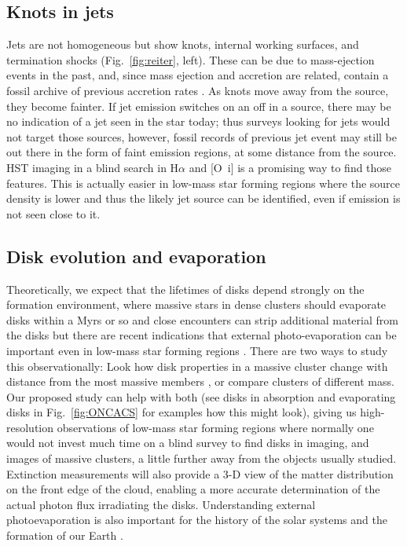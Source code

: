 \documentclass[12pt]{article}
\begin{document}
\subsection{Knots in jets}
Jets are not homogeneous but show knots, internal working surfaces, and termination shocks (Fig.~\ref{fig:reiter}, left). These can be due to mass-ejection events in the past, and, since mass ejection and accretion are related, contain a fossil archive of previous accretion rates \citep{2014A&A...563A..87E}. As knots move away from the source, they become fainter. If jet emission switches on an off in a source, there may be no indication of a jet seen in the star today; thus surveys looking for jets would not target those sources, however, fossil records of previous jet event may still be out there in the form of faint emission regions, at some distance from the source. HST imaging in a blind search in H$\alpha$ and [O~{\sc i}] is a promising way to find those features. This is actually easier in low-mass star forming regions where the source density is lower and thus the likely jet source can be identified, even if emission is not seen close to it.

\subsection{Disk evolution and evaporation}


Theoretically, we expect that the lifetimes of disks depend strongly on the formation environment, where massive stars in dense clusters should evaporate disks within a Myrs or so and close encounters can strip additional material from the disks \citep[e.g.][]{2004ApJ...611..360A,2019MNRAS.485.1489W,2019arXiv190211094N} but there are recent indications that external photo-evaporation can be important even in low-mass star forming regions \citep{2017MNRAS.468L.108H}.
There are two ways to study this observationally: Look how disk properties in a massive cluster change with distance from the most massive members \citep{2014ApJ...784...82M,2017AJ....153..240A,2018ApJ...860...77E}, or compare clusters of different mass. Our proposed study can help with both (see disks in absorption and evaporating disks in Fig.~\ref{fig:ONCACS} for examples how this might look), giving us high-resolution observations of low-mass star forming regions where normally one would not invest much time on a blind survey to find disks in imaging, and images of massive clusters, a little further away from the objects usually studied. Extinction measurements will also provide a 3-D view of the matter distribution on the front edge of the cloud, enabling a more accurate determination of the actual photon flux irradiating the disks. 
Understanding external photoevaporation is also important for the history of the solar systems and the formation of our Earth \citep{2015ApJ...815..112K}.
\end{document}
